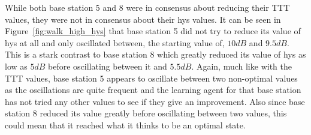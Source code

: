 While both base station 5 and 8 were in consensus about reducing their TTT values, they were not in consensus about their hys values. It can be seen in Figure~\ref{fig:walk_high_hys} that base station 5 did not try to reduce its value of hys at all and only oscillated between, the starting value of, $10 dB$ and $9.5 dB$. This is a stark contrast to base station 8 which greatly reduced its value of hys as low as $5 dB$ before oscillating between it and $5.5 dB$. Again, much like with the TTT values, base station 5 appears to oscillate between two non-optimal values as the oscillations are quite frequent and the learning agent for that base station has not tried any other values to see if they give an improvement. Also since base station 8 reduced its value greatly before oscillating between two values, this could mean that it reached what it thinks to be an optimal state.
